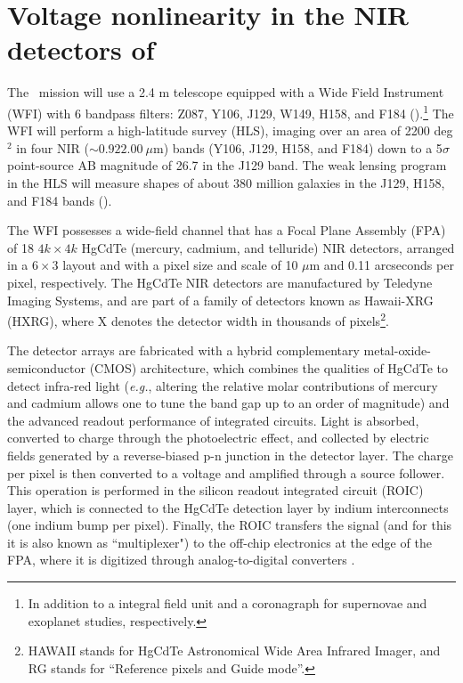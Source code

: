 \documentclass[11pt,preprint,flushrt]{aastex}
\begin{document}
\section{Voltage nonlinearity in the NIR detectors of \wfa}
\label{section:NL}

The \wfa\ mission will use a 2.4 m telescope equipped with a Wide Field Instrument (WFI) with 6 bandpass filters: Z087, Y106, J129, W149, H158, and F184 (\citealt{spergel15}).\footnote{In addition to a integral field unit and a coronagraph for supernovae and exoplanet studies, respectively.} The WFI will perform a high-latitude survey (HLS), imaging over an area of 2200 deg$^2$ in four NIR ($\sim0.92$\textendash $2.00\ \mu$m) bands (Y106, J129, H158, and F184) down to a 5$\sigma$ point-source AB magnitude of 26.7 in the J129 band. The weak lensing program in the HLS will measure shapes of about 380 million galaxies in the J129, H158, and F184 bands (\citealt{spergel15}). 

The WFI possesses a wide-field channel that has a Focal Plane Assembly (FPA) of 18 $4 k\times 4k$ HgCdTe (mercury, cadmium, and telluride) NIR detectors, arranged in a $6\times3$ layout and with a pixel size and scale of 10 $\mu$m and 0.11 arcseconds per pixel, respectively. The HgCdTe NIR detectors are manufactured by Teledyne Imaging Systems, and are part of a family of detectors known as Hawaii-XRG (HXRG), where X denotes the detector width in thousands of pixels\footnote{HAWAII stands for HgCdTe Astronomical Wide Area Infrared Imager, and RG stands for ``Reference pixels and Guide mode''.}. 

The detector arrays are fabricated with a hybrid complementary metal-oxide-semiconductor (CMOS) architecture, which combines the qualities of HgCdTe to detect infra-red light (\emph{e.g.}, altering the relative molar contributions of mercury and cadmium allows one to tune the band gap up to an order of magnitude) and the advanced readout performance of integrated circuits. Light is absorbed, converted to charge through the photoelectric effect, and collected by electric fields generated by a reverse-biased p-n junction in the detector layer.  The charge per pixel is then converted to a voltage and amplified through a source follower. This operation is performed in the silicon readout integrated circuit (ROIC) layer, which is connected to the HgCdTe detection layer by indium interconnects (one indium bump per pixel). Finally, the ROIC transfers the signal (and for this it is also known as ``multiplexer") to the off-chip electronics at the edge of the FPA, where it is digitized through analog-to-digital converters \citep{beletic08}.
\end{document}
